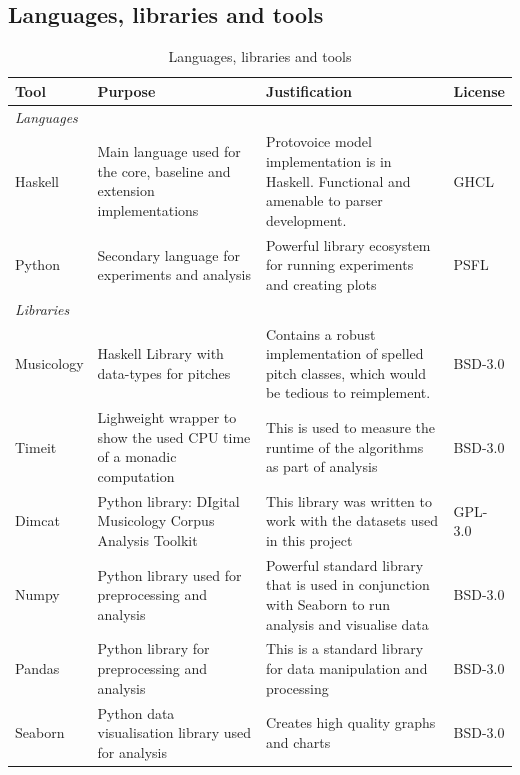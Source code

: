 \documentclass[12pt,a4paper,twoside,openany]{report} \usepackage[pdfborder={0 0 0}]{hyperref}    %
\theoremstyle{definition} \newtheorem{definition}{Definition}[section]
\begin{document}
\subsection{Languages, libraries and tools}
\label{sub:languagesLibrariesTools}

    \begin{table}[h!] \caption{Languages, libraries and tools} \label{tab:languages} \centering \footnotesize
      \renewcommand{\arraystretch}{1.3} \begin{tabularx}{\textwidth}{p{4em}X X p{4em}} {\normalsize \textbf{Tool}}
      & {\normalsize \textbf{Purpose}} & {\normalsize\textbf{Justification}} & {\normalsize \textbf{License}} \\
        \toprule \textit{Languages} &&&\\ Haskell & Main language used for the core, baseline and extension
        implementations & Protovoice model implementation is in Haskell. Functional and amenable to parser development.
                        & GHCL \\

        Python & Secondary language for experiments and analysis & Powerful library ecosystem for running experiments
        and creating plots & PSFL \\

        \midrule \textit{Libraries} &&&\\ Musicology & Haskell Library with data-types for pitches & Contains a robust
        implementation of spelled pitch classes, which would be tedious to reimplement. & BSD-3.0 \\ Timeit & Lighweight
        wrapper to show the used CPU time of a monadic computation & This is used to measure the runtime of the algorithms
        as part of analysis & BSD-3.0 \\ Dimcat & Python library: DIgital Musicology Corpus Analysis Toolkit & This
        library was written to work with the datasets used in this project & GPL-3.0 \\ Numpy & Python library used for
        preprocessing and analysis & Powerful standard library that is used in conjunction with Seaborn to run analysis
        and visualise data & BSD-3.0 \\ Pandas & Python library for preprocessing and analysis & This is a standard
        library for data manipulation and processing & BSD-3.0 \\ Seaborn & Python data visualisation library used for
        analysis & Creates high quality graphs and charts & BSD-3.0 \\ \midrule


\end{tabularx}
\end{table}
\end{document}
